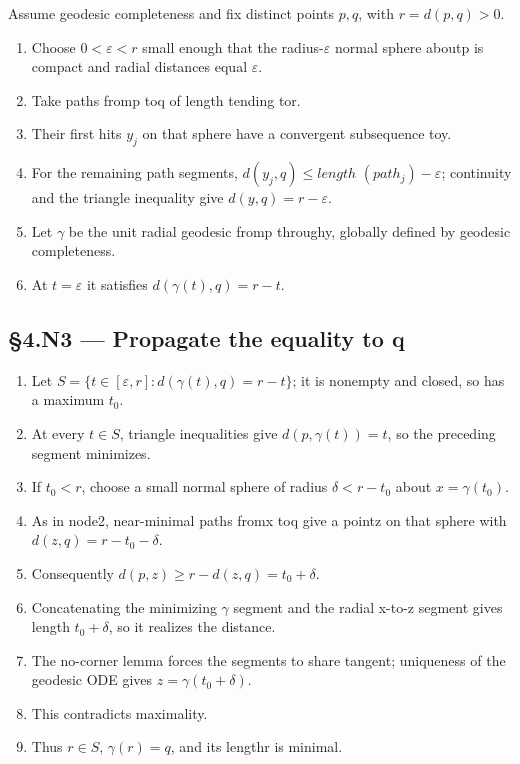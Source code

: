 \documentclass[preprint,12pt,aps,pra,showkeys,amsmath,amssymb,superscriptaddress,floatfix]{revtex4-2}
\theoremstyle{definition}
\theoremstyle{remark}
\begin{document}
Assume geodesic completeness and fix distinct points \(p,q\), with
\(r=d(p,q)>0\).

\begin{enumerate}
\def\labelenumi{\arabic{enumi}.}
\item
  Choose \(0<\varepsilon <r\) small enough that the
  radius-\(\varepsilon\) normal sphere aboutp is compact and radial
  distances equal \(\varepsilon\).
\item
  Take paths fromp toq of length tending tor.
\item
  Their first hits \(y_j\) on that sphere have a convergent subsequence
  toy.
\item
  For the remaining path segments, \(d(y_j,q)\le length\)
  \((path_j)-\varepsilon\); continuity and the triangle inequality give
  \(d(y,q)=r-\varepsilon\).
\item
  Let \(\gamma\) be the unit radial geodesic fromp throughy, globally
  defined by geodesic completeness.
\item
  At \(t=\varepsilon\) it satisfies \(d(\gamma (t),q)=r-t\).
\end{enumerate}

\subsection{§4.N3 --- Propagate the equality to
q}\label{n3-propagate-the-equality-to-q}

\begin{enumerate}
\def\labelenumi{\arabic{enumi}.}
\item
  Let \(S=\{t\in [\varepsilon ,r]:d(\gamma (t),q)=r-t\}\); it is
  nonempty and closed, so has a maximum \(t_{0}\).
\item
  At every \(t\in S\), triangle inequalities give \(d(p,\gamma (t))=t\),
  so the preceding segment minimizes.
\item
  If \(t_{0}<r\), choose a small normal sphere of radius
  \(\delta <r-t_{0}\) about \(x=\gamma (t_{0})\).
\item
  As in node2, near-minimal paths fromx toq give a pointz on that sphere
  with \(d(z,q)=r-t_{0}-\delta\).
\item
  Consequently \(d(p,z)\ge r-d(z,q)=t_{0}+\delta\).
\item
  Concatenating the minimizing \(\gamma\) segment and the radial x-to-z
  segment gives length \(t_{0}+\delta\), so it realizes the distance.
\item
  The no-corner lemma forces the segments to share tangent; uniqueness
  of the geodesic ODE gives \(z=\gamma (t_{0}+\delta )\).
\item
  This contradicts maximality.
\item
  Thus \(r\in S\), \(\gamma (r)=q\), and its lengthr is minimal.
\end{enumerate}
\end{document}
